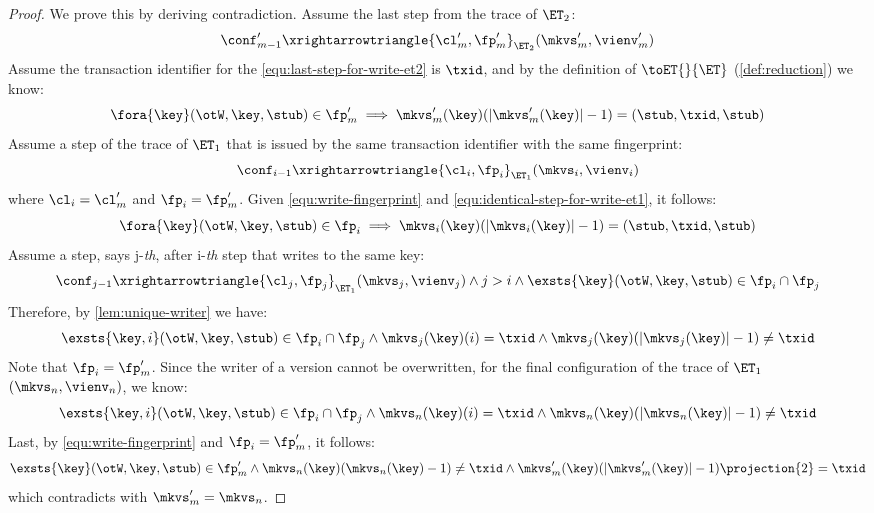 \begin{proof}
    We prove this by deriving contradiction.
    Assume the last step from the trace of \( \ET_2 \):
    \begin{equation}
        \label{equ:last-step-for-write-et2}
        \conf'_{m-1} \xrightarrowtriangle{\cl'_m, \fp'_m}_{\ET_{2}} (\mkvs'_m, \vienv'_m )
    \end{equation}
    Assume the transaction identifier for the \cref{equ:last-step-for-write-et2} is \( \txid \), and by the definition of \( \toET{}{\ET}\) (\cref{def:reduction}) we know:
    \begin{equation}
        \label{equ:write-fingerprint}
        \fora{\key} (\otW, \key, \stub) \in \fp'_m \implies \mkvs'_m(\key)(\lvert\mkvs'_m(\key)\rvert - 1) = (\stub, \txid, \stub)
    \end{equation}
    Assume a step of the trace of \( \ET_1 \) that is issued by the same transaction identifier with the same fingerprint:
    \begin{equation}
        \label{equ:identical-step-for-write-et1}
        \conf_{i-1} \xrightarrowtriangle{\cl_i, \fp_i}_{\ET_{1}} (\mkvs_i, \vienv_i)
    \end{equation}
    where \( \cl_i = \cl'_m \) and \( \fp_i = \fp'_m \).
    Given \cref{equ:write-fingerprint} and \cref{equ:identical-step-for-write-et1}, it follows:
    \[
        \fora{\key} (\otW, \key, \stub) \in \fp_i \implies \mkvs_i(\key)(\lvert\mkvs_i(\key)\rvert - 1) = (\stub, \txid, \stub)
    \]
    Assume a step, says j-\emph{th}, after i-\emph{th} step that writes to the same key:
    \[
        \conf_{j-1} \xrightarrowtriangle{\cl_j, \fp_j}_{\ET_{1}} (\mkvs_j, \vienv_j) 
        \land j > i
        \land \exsts{\key} (\otW, \key, \stub) \in \fp_i \cap \fp_j
    \]
    Therefore, by \cref{lem:unique-writer} we have:
    \[
        \exsts{\key,i} (\otW, \key, \stub) \in \fp_i \cap \fp_j \land \mkvs_j(\key)(i) = \txid \land \mkvs_j(\key)(\lvert \mkvs_j(\key) \rvert - 1) \neq \txid
    \]
    Note that \( \fp_i = \fp'_m\).
    Since the writer of a version cannot be overwritten, for the final configuration of the trace of \( \ET_1 \) \((\mkvs_n, \vienv_n)\), we know:
    \[
        \exsts{\key,i} (\otW, \key, \stub) \in \fp_i \cap \fp_j \land \mkvs_n(\key)(i) = \txid \land \mkvs_n(\key)(\lvert \mkvs_n(\key) \rvert - 1) \neq \txid
    \]
    Last, by \cref{equ:write-fingerprint} and \( \fp_i = \fp'_m\), it follows:
    \[
        \exsts{\key} (\otW, \key, \stub) \in \fp'_m \land \mkvs_n(\key)(\mkvs_n(\key) - 1) \neq \txid \land \mkvs'_m(\key)(\lvert\mkvs'_m(\key)\rvert - 1)\projection{2} = \txid
    \]
    which contradicts with \( \mkvs'_m = \mkvs_n\).
\end{proof}

